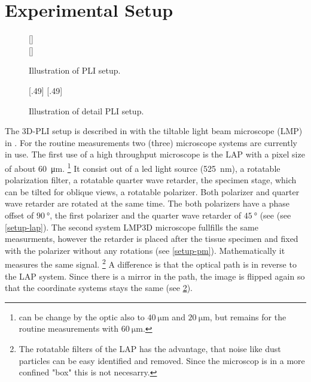\section{Experimental Setup}
%
\begin{figure}[!t]
    \captionsetup[sub]{position=top}
    \def\tikzwidth{\textwidth}
	\centering
	[\textwidth]{
	}\\
	[\textwidth]{
	}
	\caption{Illustration of PLI setup.}
	\label{fig:pli_setup}
\end{figure}
%
\begin{figure}[!t]
    \def\tikzwidth{0.42*\textwidth}
	\centering
	[.49\textwidth]{
			}\hfill
	[.49\textwidth]{
			}
	\caption{Illustration of detail PLI setup.}
	\label{fig:pli_detail}
\end{figure}
%
The \ac{3D-PLI} setup is described in \cite{Axer2011} with the tiltable light beam microscope (LMP) in \cite{Wiese:887678}.
For the routine measurements two (three) microscope systems are currently in use.
The first use of a high throughput microscope is the \ac{LAP} with a pixel size of about \SI{60}{\micro\meter}. \footnote{can be change by the optic also to $\SI{40}{\micro\meter}$ and $\SI{20}{\micro\meter}$, but remains for the routine measurements with $\SI{60}{\micro\meter}$.}
It consist out of a led light source (\SI{525}{\nano\meter}), a rotatable polarization filter, a rotatable quarter wave retarder, the specimen stage, which can be tilted for oblique views, a rotatable polarizer.
Both polarizer and quarter wave retarder are rotated at the same time.
The both polarizers have a phase offset of $\SI{90}{\degree}$, the first polarizer and the quarter wave retarder of $\SI{45}{\degree}$ (see (see \cref{setup-lap}).
The second system \ac{LMP3D} microscope fullfills the same measurments, however the retarder is placed after the tissue specimen and fixed with the polarizer without any rotations (see \cref{setup-pm}).
Mathematically it measures the same signal.
\footnote{The rotatable filters of the \ac{LAP} has the advantage, that noise like dust particles can be easy identified and removed. Since the microscop is in a more confined "box" this is not necesarry.}
A difference is that the optical path is in reverse to the \ac{LAP} system.
Since there is a mirror in the path, the image is flipped again so that the coordinate systems stays the same (see \cref{fig:pli_detail}).
% 
